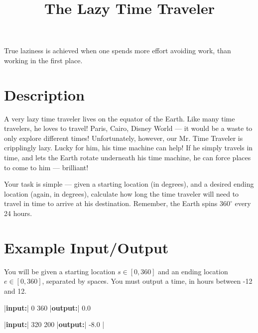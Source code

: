 \documentclass{../codeproblem}
\begin{document}
\title{The Lazy Time Traveler}

\begin{flavor}
  True laziness is achieved when one spends more effort avoiding work,
  than working in the first place.
\end{flavor}

\section*{Description}
A very lazy time traveler lives on the equator of the Earth. Like many
time travelers, he loves to travel! Paris, Cairo, Disney World --- it
would be a waste to only explore different times! Unfortunately,
however, our Mr. Time Traveler is cripplingly lazy. Lucky for him, his
time machine can help! If he simply travels in time, and lets the
Earth rotate underneath his time machine, he can force places to come
to him --- brilliant!

Your task is simple --- given a starting location (in degrees), and a
desired ending location (again, in degrees), calculate how long the
time traveler will need to travel in time to arrive at his
destination. Remember, the Earth spins $360^\circ$ every 24 hours.

\section*{Example Input/Output}

You will be given a starting location $s \in [0, 360]$ and an ending
location $e \in [0, 360]$, separated by spaces. You must
output a time, in hours between -12 and 12.

\begin{example}
|\textbf{input:}| 0 360
|\textbf{output:}| 0.0

|\textbf{input:}| 320 200
|\textbf{output:}| -8.0
|\end{example}
\end{document}
